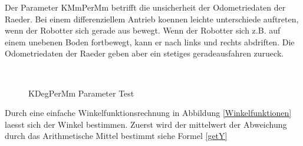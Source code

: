 \documentclass{article}
\begin{document}
\newpage
Der Parameter KMmPerMm betrifft die unsicherheit der Odometriedaten der Raeder. Bei einem differenziellem Antrieb koennen leichte unterschiede auftreten, wenn der Robotter sich gerade aus bewegt. Wenn der Robotter sich z.B. auf einem unebenen Boden fortbewegt, kann er nach links und rechts abdriften. Die Odometriedaten der Raeder geben aber ein stetiges geradeausfahren zurueck.

\begin{figure}
  \centering
  \ 
  \ 
  \caption{KDegPerMm Parameter Test}
  \label{KDegPerMmTestFigure}
\end{figure}

Durch eine einfache Winkelfunktionsrechnung in Abbildung \ref{Winkelfunktionen} laesst sich der Winkel bestimmen. 
Zuerst wird der mittelwert der Abweichung durch das Arithmetische Mittel bestimmt siehe Formel \ref{getY}
\end{document}
